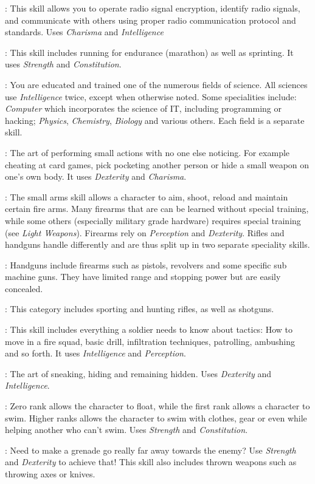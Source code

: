 : This skill allows you to operate radio signal
encryption, identify radio signals, and communicate with others using proper
radio communication protocol and standards. Uses \emph{Charisma} and
\emph{Intelligence}

: This skill includes running for endurance (marathon) as well as
sprinting. It uses \emph{Strength} and \emph{Constitution}.

: You are educated and trained one of the
numerous fields of science. All sciences use \emph{Intelligence} twice, except
when otherwise noted. Some specialities include: \emph{Computer} which
incorporates the science of IT, including programming or hacking;
\emph{Physics}, \emph{Chemistry}, \emph{Biology} and various others. Each
field is a separate skill.

: The art of performing small actions with no one else
noticing. For example cheating at card games, pick pocketing another person
or hide a small weapon on one's own body. It uses \emph{Dexterity} and
\emph{Charisma}.

: The small arms skill allows a character to aim, shoot,
reload and maintain certain fire arms. Many firearms that are can be learned
without special training, while some others (especially military grade
hardware) requires special training (see \emph{Light Weapons}). Firearms rely
on \emph{Perception} and \emph{Dexterity}. Rifles and handguns handle
differently and are thus split up in two separate speciality skills.

: Handguns include firearms such as
pistols, revolvers and some specific sub machine guns. They have limited range
and stopping power but are easily concealed.

: This category includes sporting and
hunting rifles, as well as shotguns.

: This skill includes everything a soldier needs to
know about tactics: How to move in a fire squad, basic drill, infiltration
techniques, patrolling, ambushing and so forth. It uses \emph{Intelligence} and
\emph{Perception}.

: The art of sneaking, hiding and remaining hidden. Uses
\emph{Dexterity} and \emph{Intelligence}.

: Zero rank allows the character to float, while the first rank
allows a character to swim. Higher ranks allows the character to swim with
clothes, gear or even while helping another who can't swim. Uses \emph{Strength}
and \emph{Constitution}.

: Need to make a grenade go really far away towards the enemy?
Use \emph{Strength} and \emph{Dexterity} to achieve that! This skill also
includes thrown weapons such as throwing axes or knives.
